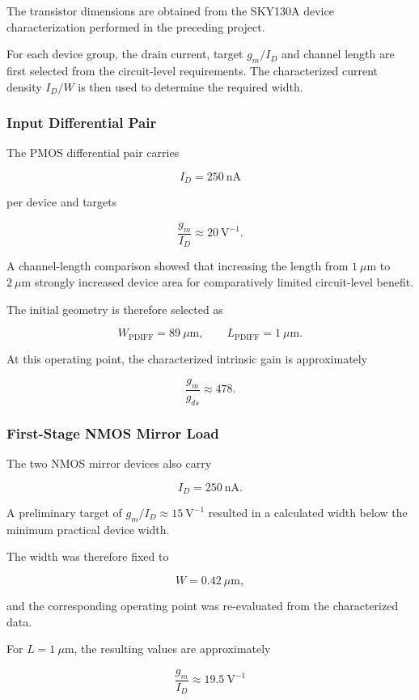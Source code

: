 The transistor dimensions are obtained from the SKY130A device
characterization performed in the preceding project.

For each device group, the drain current, target $g_m/I_D$ and channel
length are first selected from the circuit-level requirements. The
characterized current density $I_D/W$ is then used to determine the
required width.

\subsubsection{Input Differential Pair}

The PMOS differential pair carries

\[
I_D = 250~\mathrm{nA}
\]

per device and targets

\[
\frac{g_m}{I_D} \approx 20~\mathrm{V}^{-1}.
\]

A channel-length comparison showed that increasing the length from
$1~\mu\mathrm{m}$ to $2~\mu\mathrm{m}$ strongly increased device area
for comparatively limited circuit-level benefit.

The initial geometry is therefore selected as

\[
\boxed{
W_{\mathrm{PDIFF}} = 89~\mu\mathrm{m},
\qquad
L_{\mathrm{PDIFF}} = 1~\mu\mathrm{m}
}.
\]

At this operating point, the characterized intrinsic gain is approximately

\[
\frac{g_m}{g_{ds}} \approx 478.
\]


\subsubsection{First-Stage NMOS Mirror Load}

The two NMOS mirror devices also carry

\[
I_D = 250~\mathrm{nA}.
\]

A preliminary target of $g_m/I_D \approx 15~\mathrm{V}^{-1}$ resulted in
a calculated width below the minimum practical device width.

The width was therefore fixed to

\[
W = 0.42~\mu\mathrm{m},
\]

and the corresponding operating point was re-evaluated from the
characterized data.

For $L=1~\mu\mathrm{m}$, the resulting values are approximately

\[
\frac{g_m}{I_D} \approx 19.5~\mathrm{V}^{-1}
\]

